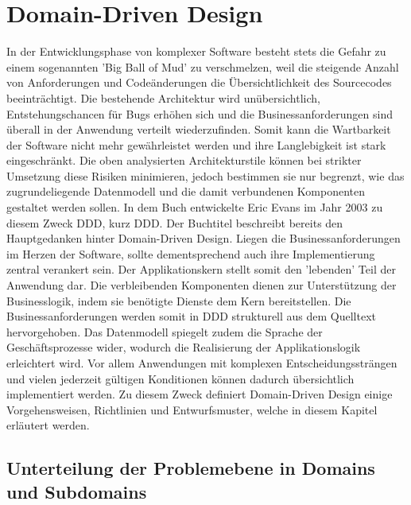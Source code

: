 \section{Domain-Driven Design}

In der Entwicklungsphase von komplexer Software besteht stets die Gefahr zu einem sogenannten 'Big Ball of Mud' zu verschmelzen, weil die steigende Anzahl von Anforderungen und Codeänderungen die Übersichtlichkeit des Sourcecodes beeinträchtigt. Die bestehende Architektur wird unübersichtlich, Entstehungschancen für Bugs erhöhen sich und die Businessanforderungen sind überall in der Anwendung verteilt wiederzufinden. Somit kann die Wartbarkeit der Software nicht mehr gewährleistet werden und ihre Langlebigkeit ist stark eingeschränkt. \cite{bbom.1999} Die oben analysierten Architekturstile können bei strikter Umsetzung diese Risiken minimieren, jedoch bestimmen sie nur begrenzt, wie das zugrundeliegende Datenmodell und die damit verbundenen Komponenten gestaltet werden sollen. In dem Buch  entwickelte Eric Evans im Jahr 2003 zu diesem Zweck \acrlong{DDD}, kurz \acrshort{DDD}. Der Buchtitel beschreibt bereits den Hauptgedanken hinter Domain-Driven Design. Liegen die Businessanforderungen im Herzen der Software, sollte dementsprechend auch ihre Implementierung zentral verankert sein. Der Applikationskern stellt somit den 'lebenden' Teil der Anwendung dar. Die verbleibenden Komponenten dienen zur Unterstützung der Businesslogik, indem sie benötigte Dienste dem Kern bereitstellen. Die Businessanforderungen werden somit in DDD strukturell aus dem Quelltext hervorgehoben. Das Datenmodell spiegelt zudem die Sprache der Geschäftsprozesse wider, wodurch die Realisierung der Applikationslogik erleichtert wird. Vor allem Anwendungen mit komplexen Entscheidungssträngen und vielen jederzeit gültigen Konditionen können dadurch übersichtlich implementiert werden. Zu diesem Zweck definiert Domain-Driven Design einige Vorgehensweisen, Richtlinien und Entwurfsmuster, welche in diesem Kapitel erläutert werden. \cite{Evans.2011, Vernon.2015}

\subsection{Unterteilung der Problemebene in Domains und Subdomains}


